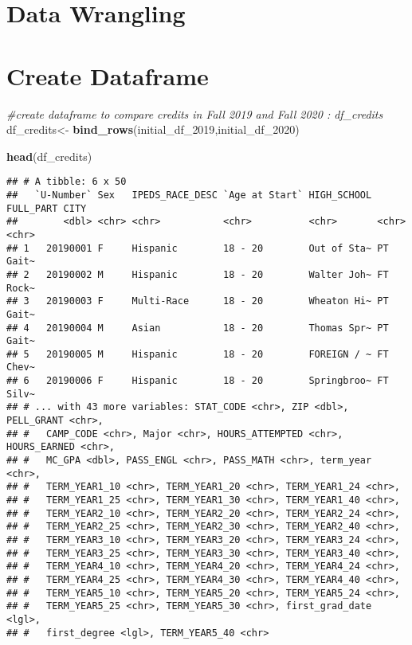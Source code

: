 \documentclass[]{article}
\newenvironment{Shaded}{\begin{snugshade}}{\end{snugshade}}
\newcommand{\CommentTok}[1]{\textcolor[rgb]{0.56,0.35,0.01}{\textit{#1}}}
\newcommand{\DecValTok}[1]{\textcolor[rgb]{0.00,0.00,0.81}{#1}}
\newcommand{\KeywordTok}[1]{\textcolor[rgb]{0.13,0.29,0.53}{\textbf{#1}}}
\newcommand{\NormalTok}[1]{#1}
\newcommand{\StringTok}[1]{\textcolor[rgb]{0.31,0.60,0.02}{#1}}
\begin{document}
\hypertarget{data-wrangling}{%
\section{Data Wrangling}\label{data-wrangling}}

\hypertarget{create-dataframe}{%
\section{Create Dataframe}\label{create-dataframe}}

\begin{Shaded}
\begin{Highlighting}[]
 \CommentTok{#create dataframe to compare credits in Fall 2019 and Fall 2020 :    df_credits }
\NormalTok{df_credits<-}\StringTok{ }\KeywordTok{bind_rows}\NormalTok{(initial_df_}\DecValTok{2019}\NormalTok{,initial_df_}\DecValTok{2020}\NormalTok{)}

\KeywordTok{head}\NormalTok{(df_credits)}
\end{Highlighting}
\end{Shaded}

\begin{verbatim}
## # A tibble: 6 x 50
##   `U-Number` Sex   IPEDS_RACE_DESC `Age at Start` HIGH_SCHOOL FULL_PART CITY 
##        <dbl> <chr> <chr>           <chr>          <chr>       <chr>     <chr>
## 1   20190001 F     Hispanic        18 - 20        Out of Sta~ PT        Gait~
## 2   20190002 M     Hispanic        18 - 20        Walter Joh~ FT        Rock~
## 3   20190003 F     Multi-Race      18 - 20        Wheaton Hi~ PT        Gait~
## 4   20190004 M     Asian           18 - 20        Thomas Spr~ PT        Gait~
## 5   20190005 M     Hispanic        18 - 20        FOREIGN / ~ FT        Chev~
## 6   20190006 F     Hispanic        18 - 20        Springbroo~ FT        Silv~
## # ... with 43 more variables: STAT_CODE <chr>, ZIP <dbl>, PELL_GRANT <chr>,
## #   CAMP_CODE <chr>, Major <chr>, HOURS_ATTEMPTED <chr>, HOURS_EARNED <chr>,
## #   MC_GPA <dbl>, PASS_ENGL <chr>, PASS_MATH <chr>, term_year <chr>,
## #   TERM_YEAR1_10 <chr>, TERM_YEAR1_20 <chr>, TERM_YEAR1_24 <chr>,
## #   TERM_YEAR1_25 <chr>, TERM_YEAR1_30 <chr>, TERM_YEAR1_40 <chr>,
## #   TERM_YEAR2_10 <chr>, TERM_YEAR2_20 <chr>, TERM_YEAR2_24 <chr>,
## #   TERM_YEAR2_25 <chr>, TERM_YEAR2_30 <chr>, TERM_YEAR2_40 <chr>,
## #   TERM_YEAR3_10 <chr>, TERM_YEAR3_20 <chr>, TERM_YEAR3_24 <chr>,
## #   TERM_YEAR3_25 <chr>, TERM_YEAR3_30 <chr>, TERM_YEAR3_40 <chr>,
## #   TERM_YEAR4_10 <chr>, TERM_YEAR4_20 <chr>, TERM_YEAR4_24 <chr>,
## #   TERM_YEAR4_25 <chr>, TERM_YEAR4_30 <chr>, TERM_YEAR4_40 <chr>,
## #   TERM_YEAR5_10 <chr>, TERM_YEAR5_20 <chr>, TERM_YEAR5_24 <chr>,
## #   TERM_YEAR5_25 <chr>, TERM_YEAR5_30 <chr>, first_grad_date <lgl>,
## #   first_degree <lgl>, TERM_YEAR5_40 <chr>
\end{verbatim}
\end{document}

